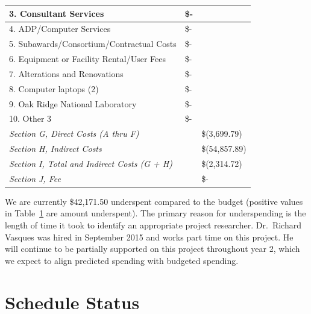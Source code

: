 \documentclass[12pt]{article}
\begin{document}
\begin{table}[h!]
\begin{center}
\begin{tabular}{ | l | l | l | }
	\hspace*{1 em}3.  Consultant Services &  \$-    & \  \\ \hline
	\hspace*{1 em}4.  ADP/Computer Services &  \$-    & \  \\ \hline
	\hspace*{1 em}5.  Subawards/Consortium/Contractual Costs &  \$-    & \  \\ \hline
	\hspace*{1 em}6.  Equipment or Facility Rental/User Fees &  \$-    & \  \\ \hline
	\hspace*{1 em}7.  Alterations and Renovations &  \$-    & \  \\ \hline
	\hspace*{1 em}8.  Computer laptops (2) & \$- & \  \\ \hline
	\hspace*{1 em}9. Oak Ridge National Laboratory &  \$-    & \  \\ \hline
	\hspace*{1 em}10. Other 3 &  \$-    & \  \\ \hline
	\textit{Section G, Direct Costs (A thru F)} &  & \$(3,699.79) \\ \hline
	\textit{Section H, Indirect Costs} &  & \$(54,857.89) \\ \hline
	\textit{Section I, Total and Indirect Costs (G + H)} &  & \$(2,314.72) \\ \hline
	\textit{Section J, Fee }&  &  \$-    \\ \hline
\end{tabular}
\label{tab:differences}
\end{center}
\end{table}

We are currently \$42,171.50 underspent compared to the budget (positive values in Table~\ref{tab:differences} are amount underspent). 
The primary reason for underspending is the length of time it took to identify an appropriate project researcher. 
Dr.\ Richard Vasques was hired in September 2015 and works part time on this project.
He will continue to be partially supported on this project throughout year 2, which we expect to align predicted spending with budgeted spending. 


\section{Schedule Status}
\label{sect::schedule}
\end{document}
